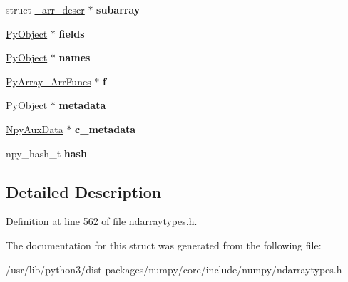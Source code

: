 \begin{DoxyCompactItemize}
\item 
struct \hyperlink{struct__arr__descr}{\+\_\+arr\+\_\+descr} $\ast$ {\bfseries subarray}\hypertarget{struct__PyArray__Descr_ab5d2379ac62e48c8703ed508daecc4a0}{}\label{struct__PyArray__Descr_ab5d2379ac62e48c8703ed508daecc4a0}

\item 
\hyperlink{struct__object}{Py\+Object} $\ast$ {\bfseries fields}\hypertarget{struct__PyArray__Descr_ae0a72436103ec67ae9b47aab064caffe}{}\label{struct__PyArray__Descr_ae0a72436103ec67ae9b47aab064caffe}

\item 
\hyperlink{struct__object}{Py\+Object} $\ast$ {\bfseries names}\hypertarget{struct__PyArray__Descr_a99a44dfc8fb9c3f1c738fb08ef5a27d4}{}\label{struct__PyArray__Descr_a99a44dfc8fb9c3f1c738fb08ef5a27d4}

\item 
\hyperlink{structPyArray__ArrFuncs}{Py\+Array\+\_\+\+Arr\+Funcs} $\ast$ {\bfseries f}\hypertarget{struct__PyArray__Descr_ab02d0b3da15ed8dca0a5558459cf70df}{}\label{struct__PyArray__Descr_ab02d0b3da15ed8dca0a5558459cf70df}

\item 
\hyperlink{struct__object}{Py\+Object} $\ast$ {\bfseries metadata}\hypertarget{struct__PyArray__Descr_a0d0266a273a18275ffd9e2301dffafe1}{}\label{struct__PyArray__Descr_a0d0266a273a18275ffd9e2301dffafe1}

\item 
\hyperlink{structNpyAuxData__tag}{Npy\+Aux\+Data} $\ast$ {\bfseries c\+\_\+metadata}\hypertarget{struct__PyArray__Descr_ab32e96ee3f730ba91cc1dfdee80c2790}{}\label{struct__PyArray__Descr_ab32e96ee3f730ba91cc1dfdee80c2790}

\item 
npy\+\_\+hash\+\_\+t {\bfseries hash}\hypertarget{struct__PyArray__Descr_a29c11870055f9b06527d941875ab6184}{}\label{struct__PyArray__Descr_a29c11870055f9b06527d941875ab6184}

\end{DoxyCompactItemize}


\subsection{Detailed Description}


Definition at line 562 of file ndarraytypes.\+h.



The documentation for this struct was generated from the following file\+:\begin{DoxyCompactItemize}
\item 
/usr/lib/python3/dist-\/packages/numpy/core/include/numpy/ndarraytypes.\+h\end{DoxyCompactItemize}
